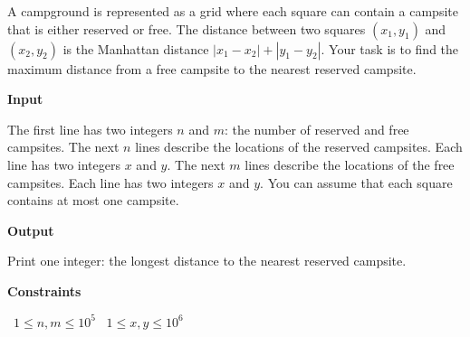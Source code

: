 A campground is represented as a grid where each square can contain a campsite that is either reserved or free. The distance between two squares $(x_1, y_1)$ and $(x_2, y_2)$ is the Manhattan distance $|x_1 - x_2| + |y_1 - y_2|$.
Your task is to find the maximum distance from a free campsite to the nearest reserved campsite.

\vspace{0.3cm}\noindent\textbf{Input}

The first line has two integers $n$ and $m$:
the number of reserved and free campsites.
The next $n$ lines describe the locations of the reserved campsites. Each line has two integers $x$ and $y$.
The next $m$ lines describe the locations of the free campsites. Each line has two integers $x$ and $y$.
You can assume that each square contains at most one campsite.

\vspace{0.3cm}\noindent\textbf{Output}

Print one integer: the longest distance to the nearest reserved campsite.

\vspace{0.3cm}\noindent\textbf{Constraints}

\textbullet\ $1 \le n, m \le 10^5$
\textbullet\ $1 \le x, y \le 10^6$